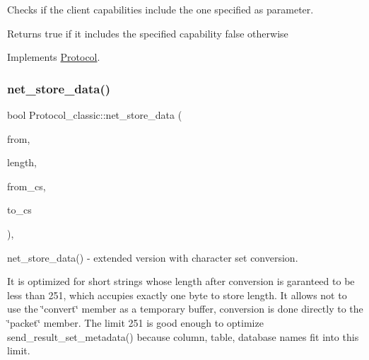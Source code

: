 Checks if the client capabilities include the one specified as parameter.

\begin{DoxyReturn}{Returns}
true if it includes the specified capability false otherwise 
\end{DoxyReturn}


Implements \mbox{\hyperlink{classProtocol_aea1d05eaf76707b3772a00a43ea0e49b}{Protocol}}.

\mbox{\label{classProtocol__classic_a378a497216ff06610382cb3ed1f85031}} 
\subsubsection{\texorpdfstring{net\+\_\+store\+\_\+data()}{net\_store\_data()}}
{\footnotesize\ttfamily bool Protocol\+\_\+classic\+::net\+\_\+store\+\_\+data (\begin{DoxyParamCaption}\item[{const uchar $\ast$}]{from,  }\item[{size\+\_\+t}]{length,  }\item[{const C\+H\+A\+R\+S\+E\+T\+\_\+\+I\+N\+FO $\ast$}]{from\+\_\+cs,  }\item[{const C\+H\+A\+R\+S\+E\+T\+\_\+\+I\+N\+FO $\ast$}]{to\+\_\+cs }\end{DoxyParamCaption})\hspace{0.3cm}{\ttfamily [protected]}, {\ttfamily [virtual]}}

net\+\_\+store\+\_\+data() -\/ extended version with character set conversion.

It is optimized for short strings whose length after conversion is garanteed to be less than 251, which accupies exactly one byte to store length. It allows not to use the \char`\"{}convert\char`\"{} member as a temporary buffer, conversion is done directly to the \char`\"{}packet\char`\"{} member. The limit 251 is good enough to optimize send\+\_\+result\+\_\+set\+\_\+metadata() because column, table, database names fit into this limit. \mbox{\label{classProtocol__classic_afabebba2b775725054454c1cbe2e3721}} 

